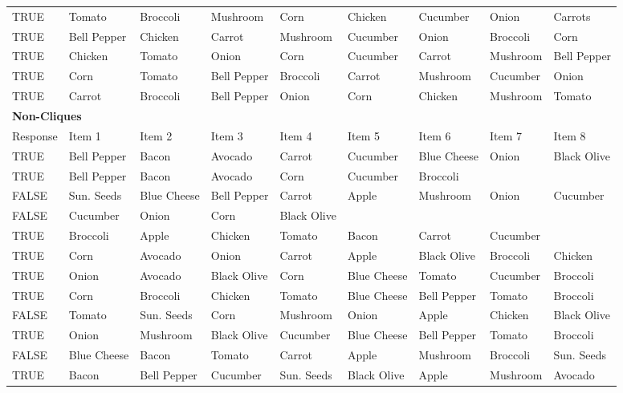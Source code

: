 \begin{landscape}
\begin{longtable}{lllllllll}
TRUE & Tomato & Broccoli & Mushroom & Corn & Chicken & Cucumber & Onion & Carrots \\
TRUE & Bell Pepper & Chicken & Carrot & Mushroom & Cucumber & Onion & Broccoli & Corn \\
TRUE & Chicken & Tomato & Onion & Corn & Cucumber & Carrot & Mushroom & Bell Pepper \\
TRUE & Corn & Tomato & Bell Pepper & Broccoli & Carrot & Mushroom & Cucumber & Onion \\
TRUE & Carrot & Broccoli & Bell Pepper & Onion & Corn & Chicken & Mushroom & Tomato \\
\midrule
\multicolumn{9}{l}{\bf Non-Cliques} \\
\cmidrule{1-2}
Response & Item 1 & Item 2 & Item 3 & Item 4 & Item 5 & Item 6 & Item 7 & Item 8\\
\midrule
TRUE & Bell Pepper & Bacon & Avocado & Carrot & Cucumber & Blue Cheese & Onion & Black Olive \\
TRUE & Bell Pepper & Bacon & Avocado & Corn & Cucumber & Broccoli && \\
FALSE & Sun. Seeds & Blue Cheese & Bell Pepper & Carrot & Apple & Mushroom & Onion & Cucumber \\
FALSE & Cucumber & Onion & Corn & Black Olive &&&& \\
TRUE & Broccoli & Apple & Chicken & Tomato & Bacon & Carrot & Cucumber & \\
TRUE & Corn & Avocado & Onion & Carrot & Apple & Black Olive & Broccoli & Chicken \\
TRUE & Onion & Avocado & Black Olive & Corn & Blue Cheese & Tomato & Cucumber & Broccoli \\
TRUE & Corn & Broccoli & Chicken & Tomato & Blue Cheese & Bell Pepper & Tomato & Broccoli \\
FALSE & Tomato & Sun. Seeds & Corn & Mushroom & Onion & Apple & Chicken & Black Olive \\
TRUE & Onion & Mushroom & Black Olive & Cucumber & Blue Cheese & Bell Pepper & Tomato & Broccoli \\
FALSE & Blue Cheese & Bacon & Tomato & Carrot & Apple & Mushroom & Broccoli & Sun. Seeds \\
TRUE & Bacon & Bell Pepper & Cucumber & Sun. Seeds & Black Olive & Apple & Mushroom & Avocado
\label{tab:ponesalad}
\end{longtable}
\end{landscape}


